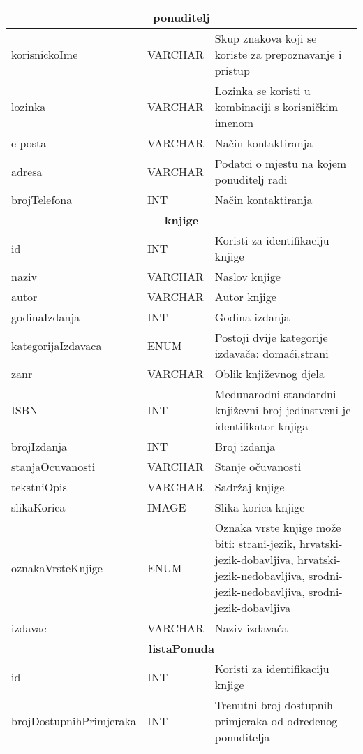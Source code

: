 \documentclass{article}
\begin{document}
	\begin{tabular}{ |p{4cm}|p{3cm}|p{5cm}|  }
		\hline
		\multicolumn{3}{|c|}{\textbf{ponuditelj}} \\
		\bottomrule[2pt]
		\cellcolor{green!25}korisnickoIme & VARCHAR &Skup znakova koji se koriste za prepoznavanje i pristup\\
		\hline
		lozinka & VARCHAR & Lozinka se koristi u kombinaciji s korisničkim imenom\\
		\hline
		e-posta & VARCHAR & Način kontaktiranja\\
		\hline
		adresa & VARCHAR & Podatci o mjestu na kojem ponuditelj radi\\
		\hline
		brojTelefona & INT & Način kontaktiranja\\
		\hline
		\hline
		\multicolumn{3}{|c|}{\textbf{knjige}} \\
		\bottomrule[2pt]
		\cellcolor{green!25}id & INT &Koristi za identifikaciju knjige\\
		\hline
		naziv & VARCHAR & Naslov knjige\\
		\hline
		autor & VARCHAR & Autor knjige\\
		\hline
		godinaIzdanja & INT & Godina izdanja\\
		\hline
		kategorijaIzdavaca & ENUM & Postoji dvije kategorije izdavača: domaći,strani\\
		\hline
		zanr & VARCHAR & Oblik književnog djela\\
		\hline
		ISBN & INT & Medunarodni standardni književni broj jedinstveni je identifikator knjiga\\
		\hline
		brojIzdanja & INT & Broj izdanja\\
		\hline
		stanjaOcuvanosti & VARCHAR & Stanje očuvanosti\\
		\hline
		tekstniOpis & VARCHAR & Sadržaj knjige\\
		\hline
		slikaKorica & IMAGE & Slika korica knjige\\
		\hline
		oznakaVrsteKnjige & ENUM & Oznaka vrste knjige može biti: strani-jezik, hrvatski-jezik-dobavljiva, hrvatski-jezik-nedobavljiva, srodni-jezik-nedobavljiva, srodni-jezik-dobavljiva\\
		\hline
		izdavac & VARCHAR & Naziv izdavača\\
		\hline
		\hline
		\multicolumn{3}{|c|}{\textbf{listaPonuda}} \\
		\bottomrule[2pt]
		\cellcolor{blue!10}id & INT & Koristi za identifikaciju knjige\\
		\hline
		brojDostupnihPrimjeraka & INT & Trenutni broj dostupnih primjeraka od odredenog ponuditelja\\

\end{tabular}
\end{document}

